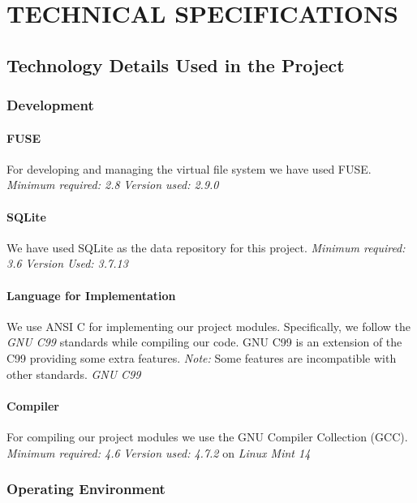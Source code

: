 \chapter {TECHNICAL SPECIFICATIONS}
\section{Technology Details Used in the Project}
\subsection{Development}
\subsubsection {FUSE}
For developing and managing the virtual file system we have used FUSE. \newline
\emph{Minimum required: 2.8} \newline
\emph{Version used: 2.9.0} 

\subsubsection {SQLite}
We have used SQLite as the data repository for this project. \newline
\emph{Minimum required: 3.6} \newline
\emph{Version Used: 3.7.13}

\subsubsection {Language for Implementation}
We use ANSI C for implementing our project modules. Specifically, we follow the \textit{GNU C99} standards while compiling our code. GNU C99 is an extension of the C99 providing some extra features. \emph{Note:} Some features are incompatible with other standards. \newline
\emph{GNU C99}

\subsubsection {Compiler}
For compiling our project modules we use the GNU Compiler Collection (GCC).  \newline
\emph{Minimum required: 4.6} \newline
\emph{Version used: 4.7.2} on \emph{Linux Mint 14}

\subsection {Operating Environment}
